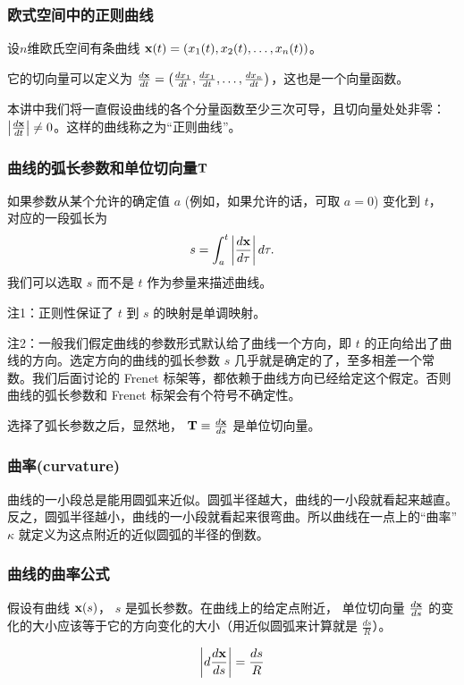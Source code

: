 \documentclass[CJK,13pt]{beamer}
\date{}
\begin{document}
  \bch
{}


\begin{frame}
  \frametitle{欧式空间中的正则曲线}
  设$n$维欧氏空间有条曲线 ${\mathbf{x}}(t) = \left(x_1(t), x_2(t), \ldots, x_n(t)\right)$。

  \skipline

  它的切向量可以定义为 $\frac{d{\mathbf{x}}}{dt} = \left(\frac{dx_1}{dt}, \frac{dx_1}{dt}, \ldots, \frac{dx_n}{dt}\right)$，这也是一个向量函数。

  \skipline
  
  本讲中我们将一直假设曲线的各个分量函数至少三次可导，且切向量处处非零： $\left\vert\frac{d{\mathbf{x}}}{dt}\right\vert\ne 0$。这样的曲线称之为“{\blue 正则曲线}”。

\end{frame}



\begin{frame}
  \frametitle{曲线的弧长参数和单位切向量${\mathbf{T}}$}
  如果参数从某个允许的确定值 $a$ (例如，如果允许的话，可取 $a=0$) 变化到 $t$， 对应的一段弧长为
  $$ s = \int_a^t \left\vert\frac{d{\mathbf{x}}}{d\tau}\right\vert d\tau. $$
  我们可以选取 $s$ 而不是 $t$ 作为参量来描述曲线。
  
  {\scriptsize 注1：正则性保证了 $t$ 到 $s$ 的映射是单调映射。}

  \skipline

  {\scriptsize 注2：一般我们假定曲线的参数形式默认给了曲线一个方向，即 $t$ 的正向给出了曲线的方向。选定方向的曲线的弧长参数 $s$ 几乎就是确定的了，至多相差一个常数。我们后面讨论的 Frenet 标架等，都依赖于曲线方向已经给定这个假定。否则曲线的弧长参数和 Frenet 标架会有个符号不确定性。}

  \skipline
  
  选择了弧长参数之后，显然地， ${\mathbf{T}} \equiv \frac{d{\mathbf{x}}}{ds}$ 是{\blue 单位切向量}。  
\end{frame}


\begin{frame}
  \frametitle{曲率(curvature)}

  曲线的一小段总是能用圆弧来近似。圆弧半径越大，曲线的一小段就看起来越直。反之，圆弧半径越小，曲线的一小段就看起来很弯曲。所以曲线在一点上的{\blue “曲率” $\kappa$ 就定义为这点附近的近似圆弧的半径的倒数}。
  

\end{frame}



\begin{frame}
  \frametitle{曲线的曲率公式}

  假设有曲线 ${\mathbf{x}}(s)$， $s$ 是弧长参数。在曲线上的给定点附近， 单位切向量 $\frac{d{\mathbf{x}}}{ds}$ 的变化的大小应该等于它的方向变化的大小（用近似圆弧来计算就是 $\frac{ds}{R}$）。
  
  $$ \left\vert d \frac{d{\mathbf{x}}}{ds}\right\vert = \frac{ds}{R} $$



\end{frame}
\end{document}
